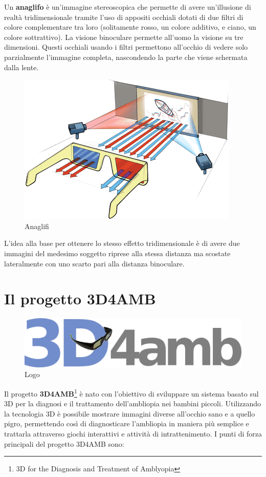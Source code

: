 \documentclass[
	corpo=12pt,
	twoside,
 	evenboxes,
	tipotesi=triennale,
    	stile=classica,
   	 greek,
]{toptesi}
\begin{document}
Un \textbf{anaglifo} è un'immagine stereoscopica che permette di avere un'illusione di realtà tridimensionale tramite l'uso di appositi occhiali dotati di due filtri di colore complementare tra loro (solitamente rosso, un colore additivo, e ciano, un colore sottrattivo). La visione binoculare permette all'uomo la visione su tre dimensioni. Questi occhiali usando i filtri permettono all'occhio di vedere solo parzialmente l'immagine completa, nascondendo la parte che viene schermata dalla lente.

\begin{figure}[H]
\centering
\includegraphics[width=0.55\columnwidth]{images/anaglifi.png}
\caption{Anaglifi}
\label{fig:anaglifi}
\end{figure}

L'idea alla base per ottenere lo stesso effetto tridimensionale è di avere due immagini del medesimo soggetto riprese alla stessa distanza ma scostate lateralmente con uno scarto pari alla distanza binoculare.

\newpage

\section{Il progetto 3D4AMB}
\label{sec:ilprogetto3d4amb}

\begin{figure}[H]
\centering
\includegraphics[width=0.50\columnwidth]{images/3d4amb.png}
\caption{Logo}
\label{fig:3d4amb}
\end{figure}
Il progetto \textbf{3D4AMB}\footnote{3D for the Diagnosis and Treatment of Amblyopia} \cite{3d4amb} è nato con l’obiettivo di sviluppare un sistema basato sul 3D per la diagnosi e il trattamento dell’ambliopia nei bambini piccoli. Utilizzando la tecnologia 3D è possibile mostrare immagini diverse all’occhio sano e a quello pigro, permettendo così di diagnosticare l’ambliopia in maniera più semplice e trattarla attraverso giochi interattivi e attività di intrattenimento.
I punti di forza principali del progetto 3D4AMB sono:
\end{document}
